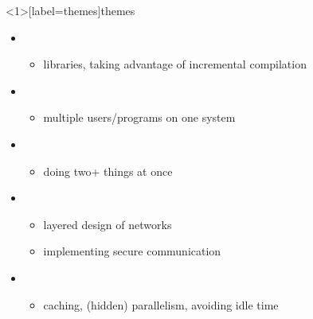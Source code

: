 \begin{frame}<1>[label=themes]{themes}
\begin{itemize}
    \item {}
        \begin{itemize}
        \item libraries, taking advantage of incremental compilation
        \end{itemize}
    \item {}
        \begin{itemize}
        \item multiple users/programs on one system
        \end{itemize}
    \item {}
        \begin{itemize}
        \item doing two+ things at once
        \end{itemize}
    \item {}
        \begin{itemize}
        \item layered design of networks
        \item implementing secure communication
        \end{itemize}
    \item {}
        \begin{itemize}
        \item caching, (hidden) parallelism, avoiding idle time
        \end{itemize}
    \end{itemize}
\end{frame}

